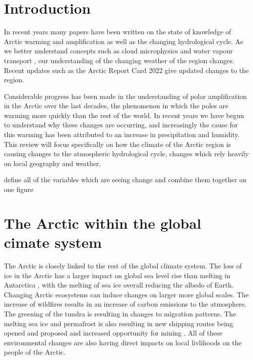 \documentclass[11pt, oneside]{article}
\begin{document}


\section{Introduction}
In recent years many papers have been written on the state of knowledge of Arctic warming and amplification \cite{davy2018arctic, previdi2021arctic, vihma2016atmospheric, serreze2011processes} as well as the changing hydrological cycle. As we better understand concepts such as cloud microphysics \cite{pithan2014mixed} and water vapour transport \cite{gimeno2019atmospheric}, our understanding of the changing weather of the region changes. Recent updates such as the Arctic Report Card 2022 \cite{druckenmiller2022arctic} give updated changes to the region.


Considerable progress has been made in the understanding of polar amplification in the Arctic over the last decades, the phenomenon in which the poles are warming more quickly than the rest of the world. In recent years we have begun to understand why these changes are occurring, and increasingly the cause for this warming has been attributed to an increase in precipitation and humidity. This review will focus specifically on how the climate of the Arctic region is causing changes to the atmospheric hydrological cycle, changes which rely heavily on local geography and weather. 


define all of the variables which are seeing change and combine them together on one figure



\section{The Arctic within the global cimate system}
The Arctic is closely linked to the rest of the global climate system. The loss of ice in the Arctic has a larger impact on global sea level rise than melting in Antarctica \cite{AMAP}, with the melting of sea ice overall reducing the albedo of Earth. Changing Arctic ecosystems can induce changes on larger more global scales. The increase of wildfires results in an increase of carbon emissions to the atmosphere. The greening of the tundra is resulting in changes to migration patterns. The melting sea ice and permafrost is also resulting in new shipping routes being opened and proposed and increased opportunity for mining \cite{AMAP}. All of these environmental changes are also having direct impacts on local livlihoods on the people of the Arctic.  
\end{document}
